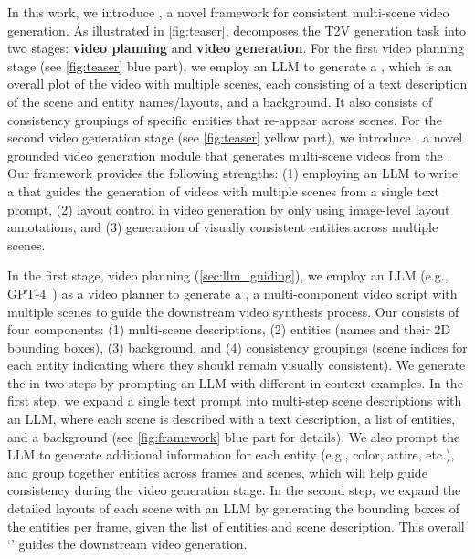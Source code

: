 \documentclass{article}
\begin{document}
In this work, we introduce \textbf{\method{}}, a novel framework for consistent multi-scene video generation. As illustrated in \cref{fig:teaser},
\method{} decomposes the T2V generation task into two stages:
\textbf{video planning} and \textbf{video generation}.
For the first video planning stage (see \cref{fig:teaser} \textcolor{ProcessBlue}{blue} part), we employ an LLM to generate a \videoplan{}, which is an overall plot of the video with multiple scenes, each consisting of a text description of the scene and entity names/layouts, and a background. It also consists of consistency groupings 
of specific entities that re-appear across scenes.
For the second video generation stage (see \cref{fig:teaser} \textcolor{Dandelion}{yellow} part), we introduce \videomodule{}, a novel grounded video generation module that generates multi-scene videos from the \videoplan{}.
Our framework provides the following strengths:
(1) employing an LLM to write a \videoplan{} that guides the generation of videos {with multiple scenes from a single text prompt},
(2) layout control in video generation by only using image-level layout annotations, and (3) generation of visually consistent entities across multiple scenes. 


In the first stage, video planning (\cref{sec:llm_guiding}),
we employ an LLM (e.g., GPT-4~\citep{openai2023gpt4}) as a video planner to generate a \textbf{\videoplan{}},
a multi-component video script with multiple scenes to guide the downstream video synthesis process.
Our \videoplan{} consists of four components: 
(1) multi-scene descriptions,
(2) entities (names and their 2D bounding boxes),
(3) background,
and
(4) consistency groupings (scene indices for each entity indicating where they should remain visually consistent).
We generate the \videoplan{} in two steps by prompting an LLM with different in-context examples. 
In the first step, we expand a single text prompt into multi-step scene descriptions with an LLM, 
where each scene is described with a text description, a list of entities, and a background (see \cref{fig:framework} \textcolor{ProcessBlue}{blue} part for details).
We also prompt the LLM to generate additional information for each entity (e.g., color, attire, etc.), and group together entities across frames and scenes, which will help guide consistency during the video generation stage.
In the second step, we expand the detailed layouts of each scene with an LLM by generating the bounding boxes of the entities per frame, given the list of entities and scene description.
This overall `\videoplan{}' guides the downstream video generation.
\end{document}
